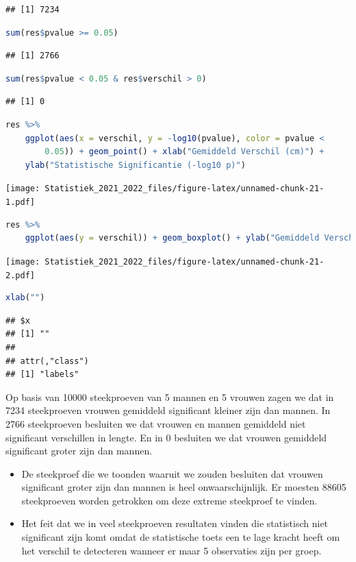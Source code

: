\documentclass[
  12pt,dutch,coursenotes]{book}
\theoremstyle{definition}
\theoremstyle{definition}
\theoremstyle{definition}
\theoremstyle{definition}
\theoremstyle{remark}
\begin{document}
\begin{lstlisting}
## [1] 7234
\end{lstlisting}

\begin{lstlisting}[language=R]
sum(res$pvalue >= 0.05)
\end{lstlisting}

\begin{lstlisting}
## [1] 2766
\end{lstlisting}

\begin{lstlisting}[language=R]
sum(res$pvalue < 0.05 & res$verschil > 0)
\end{lstlisting}

\begin{lstlisting}
## [1] 0
\end{lstlisting}

\begin{lstlisting}[language=R]
res %>%
    ggplot(aes(x = verschil, y = -log10(pvalue), color = pvalue <
        0.05)) + geom_point() + xlab("Gemiddeld Verschil (cm)") +
    ylab("Statistische Significantie (-log10 p)")
\end{lstlisting}

\texttt{[image: Statistiek\_2021\_2022\_files/figure-latex/unnamed-chunk-21-1.pdf]}

\begin{lstlisting}[language=R]
res %>%
    ggplot(aes(y = verschil)) + geom_boxplot() + ylab("Gemiddeld Verschil (cm)")
\end{lstlisting}

\texttt{[image: Statistiek\_2021\_2022\_files/figure-latex/unnamed-chunk-21-2.pdf]}

\begin{lstlisting}[language=R]
xlab("")
\end{lstlisting}

\begin{lstlisting}
## $x
## [1] ""
## 
## attr(,"class")
## [1] "labels"
\end{lstlisting}

Op basis van 10000 steekproeven van 5 mannen en 5 vrouwen zagen we dat in 7234 steekproeven vrouwen gemiddeld significant kleiner zijn dan mannen. In 2766 steekproeven besluiten we dat vrouwen en mannen gemiddeld niet significant verschillen in lengte. En in 0 besluiten we dat vrouwen gemiddeld significant groter zijn dan mannen.

\begin{itemize}
\item
  De steekproef die we toonden waaruit we zouden besluiten dat vrouwen significant groter zijn dan mannen is heel onwaarschijnlijk. Er moesten 88605 steekproeven worden getrokken om deze extreme steekproef te vinden.
\item
  Het feit dat we in veel steekproeven resultaten vinden die statistisch niet significant zijn komt omdat de statistische toets een te lage kracht heeft om het verschil te detecteren wanneer er maar 5 observaties zijn per groep.
\end{itemize}
\end{document}
